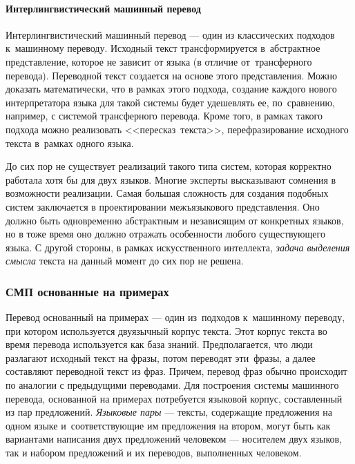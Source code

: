 \paragraph{Интерлингвистический машинный перевод}

Интерлингвистический машинный перевод --- один из классических подходов 
к~машинному переводу. 
Исходный текст трансформируется в~абстрактное представление, 
которое не зависит от языка (в отличие от~трансферного перевода). 
Переводной текст создается на основе этого представления. 
Можно доказать математически, что в рамках этого подхода, 
создание каждого нового интерпретатора языка для такой системы будет удешевлять ее, 
по~сравнению, например, с системой трансферного перевода. 
Кроме того, в рамках такого подхода можно реализовать <<пересказ~текста>>, 
перефразирование исходного текста в~рамках одного языка.

До сих пор не существует реализаций такого типа систем, 
которая корректно работала хотя бы для двух языков. 
Многие эксперты высказывают сомнения в возможности реализации. 
Самая большая сложность для создания подобных систем заключается 
в проектировании межъязыкового представления. 
Оно должно быть одновременно абстрактным и независящим от конкретных языков, 
но в тоже время оно должно отражать особенности любого существующего языка. 
С другой стороны, в рамках искусственного интеллекта, 
\emph{задача выделения смысла} текста на данный момент до сих пор не решена.


\subsubsection{СМП основанные на примерах}

Перевод основанный на примерах --- один из~подходов 
к~машинному переводу, при котором используется 
двуязычный корпус текста. 
Этот корпус текста во время перевода используется как база знаний. 
Предполагается, что люди разлагают исходный текст на фразы, 
потом переводят эти~фразы, 
а далее составляют переводной текст из фраз. 
Причем, перевод фраз обычно происходит по аналогии с предыдущими переводами.
Для построения системы машинного перевода, основанной на примерах  
потребуется языковой корпус, составленный из пар предложений.
\emph{Языковые пары} --- тексты, содержащие предложения на одном 
языке и~соответствующие им предложения на втором, могут быть 
как вариантами написания двух предложений 
человеком --- носителем двух языков, 
так и набором предложений и их переводов, выполненных человеком.

